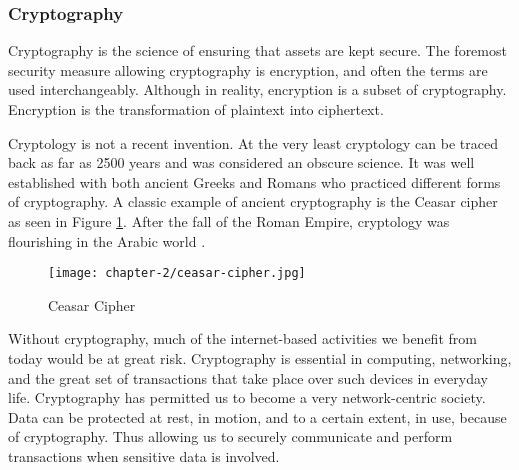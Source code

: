 

\subsubsection{Cryptography}
Cryptography is the science of ensuring that assets are kept secure. The foremost security measure allowing cryptography is encryption, and often the terms are used interchangeably. Although in reality, encryption is a subset of cryptography. Encryption is the transformation of plaintext into ciphertext. 

Cryptology is not a recent invention. At the very least cryptology can be traced back as far as 2500 years and was considered an obscure science. It was well established with both ancient Greeks and Romans who practiced different forms of cryptography. A classic example of ancient cryptography is the Ceasar cipher as seen in Figure \ref{fig:ceasar-cipher}. After the fall of the Roman Empire, cryptology was flourishing in the Arabic world \cite{dooley2018history}.

\begin{figure}[!h]
    \texttt{[image: chapter-2/ceasar-cipher.jpg]}
    \caption{Ceasar Cipher}\label{fig:ceasar-cipher}
\end{figure}

Without cryptography, much of the internet-based activities we benefit from today would be at great risk. Cryptography is essential in computing, networking, and the great set of transactions that take place over such devices in everyday life. Cryptography has permitted us to become a very network-centric society. 
Data can be protected at rest, in motion, and to a certain extent, in use, because of cryptography. Thus allowing us to securely communicate and perform transactions when sensitive data is involved.

